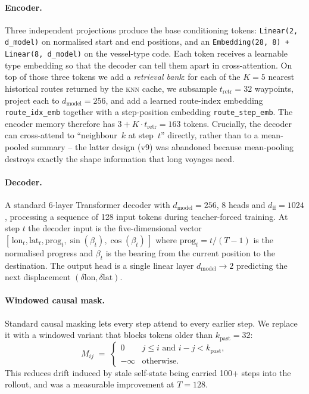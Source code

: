 \documentclass[11pt,a4paper]{article}
\newcommand{\knn}{\textsc{knn}}
\newcommand{\code}[1]{\texttt{\small #1}}
\begin{document}
\paragraph{Encoder.}
Three independent projections produce the base conditioning tokens:
\code{Linear(2, d\_model)} on normalised start and end positions, and an
\code{Embedding(28, 8) + Linear(8, d\_model)} on the vessel-type code.
Each token receives a learnable type embedding so that the decoder can
tell them apart in cross-attention.
On top of those three tokens we add a \emph{retrieval bank}: for each of
the $K = 5$ nearest historical routes returned by the \knn{} cache, we
subsample $t_{\mathrm{retr}} = 32$ waypoints, project each to
$d_{\mathrm{model}} = 256$, and add a learned route-index embedding
\code{route\_idx\_emb} together with a step-position embedding
\code{route\_step\_emb}.
The encoder memory therefore has
$3 + K \cdot t_{\mathrm{retr}} = 163$ tokens.
Crucially, the decoder can cross-attend to ``neighbour~$k$ at step~$t$''
directly, rather than to a mean-pooled summary -- the latter design
(v9) was abandoned because mean-pooling destroys exactly the shape
information that long voyages need.

\paragraph{Decoder.}
A standard 6-layer Transformer decoder with $d_{\mathrm{model}} = 256$,
8 heads and $d_{\mathrm{ff}} = 1024$, processing a sequence of 128
input tokens during teacher-forced training.  At step $t$ the decoder
input is the five-dimensional vector
$[\,\mathrm{lon}_t, \mathrm{lat}_t, \mathrm{prog}_t,
   \sin(\beta_t), \cos(\beta_t)\,]$ where $\mathrm{prog}_t = t / (T-1)$
is the normalised progress and $\beta_t$ is the bearing from the
current position to the destination.  The output head is a single linear
layer $d_{\mathrm{model}} \to 2$ predicting the next displacement
$(\delta\mathrm{lon}, \delta\mathrm{lat})$.

\paragraph{Windowed causal mask.}
Standard causal masking lets every step attend to every earlier step.
We replace it with a windowed variant that blocks tokens older than
$k_{\mathrm{past}} = 32$:
\[
  M_{ij} \;=\; \begin{cases}
    0 & j \leq i \text{ and } i - j < k_{\mathrm{past}}, \\
    -\infty & \text{otherwise.}
  \end{cases}
\]
This reduces drift induced by stale self-state being carried 100+ steps
into the rollout, and was a measurable improvement at $T = 128$.
\end{document}
